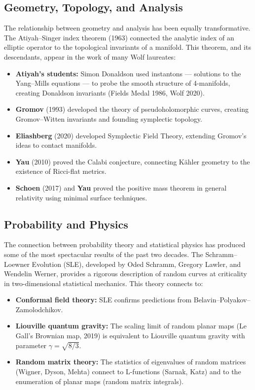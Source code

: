 \subsection{Geometry, Topology, and Analysis}

The relationship between geometry and analysis has been equally transformative. The Atiyah--Singer index theorem (1963) connected the analytic index of an elliptic operator to the topological invariants of a manifold. This theorem, and its descendants, appear in the work of many Wolf laureates:

\begin{itemize}
    \item \textbf{Atiyah's students:} Simon Donaldson used instantons --- solutions to the Yang--Mills equations --- to probe the smooth structure of 4-manifolds, creating Donaldson invariants (Fields Medal 1986, Wolf 2020).
    \item \textbf{Gromov} (1993) developed the theory of pseudoholomorphic curves, creating Gromov--Witten invariants and founding symplectic topology.
    \item \textbf{Eliashberg} (2020) developed Symplectic Field Theory, extending Gromov's ideas to contact manifolds.
    \item \textbf{Yau} (2010) proved the Calabi conjecture, connecting K\"ahler geometry to the existence of Ricci-flat metrics.
    \item \textbf{Schoen} (2017) and \textbf{Yau} proved the positive mass theorem in general relativity using minimal surface techniques.
\end{itemize}

\subsection{Probability and Physics}

The connection between probability theory and statistical physics has produced some of the most spectacular results of the past two decades. The Schramm--Loewner Evolution (SLE), developed by Oded Schramm, Gregory Lawler, and Wendelin Werner, provides a rigorous description of random curves at criticality in two-dimensional statistical mechanics. This theory connects to:

\begin{itemize}
    \item \textbf{Conformal field theory:} SLE confirms predictions from Belavin--Polyakov--Zamolodchikov.
    \item \textbf{Liouville quantum gravity:} The scaling limit of random planar maps (Le Gall's Brownian map, 2019) is equivalent to Liouville quantum gravity with parameter $\gamma = \sqrt{8/3}$.
    \item \textbf{Random matrix theory:} The statistics of eigenvalues of random matrices (Wigner, Dyson, Mehta) connect to L-functions (Sarnak, Katz) and to the enumeration of planar maps (random matrix integrals).
\end{itemize}

